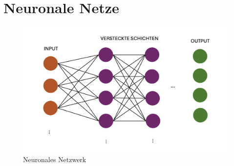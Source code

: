 \documentclass[../main.tex]{subfiles}
\begin{document}
\section{Neuronale Netze}

\begin{figure}[h!]
  \includegraphics[scale=0.6]{bilder/NeuralNetwork.png}
  \caption{Neuronales Netzwerk}
  \label{fig:NN}
\end{figure}
\end{document}
